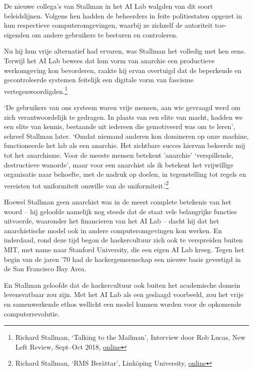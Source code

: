 \documentclass[smalldemyvopaper,11pt,twoside,onecolumn,openright,extrafontsizes,hidelinks]{memoir}
\begin{document}
De nieuwe collega's van Stallman in het AI Lab walgden van dit soort
beleidslijnen. Volgens hen hadden de beheerders in feite politiestaten
opgezet in hun respectieve computeromgevingen, waarbij ze zichzelf de
autoriteit toe-eigenden om andere gebruikers te besturen en controleren.

Nu hij hun vrije alternatief had ervaren, was Stallman het volledig met
hen eens. Terwijl het AI Lab bewees dat hun vorm van anarchie een
productieve werkomgeving kon bevorderen, raakte hij ervan overtuigd dat
de beperkende en gecontroleerde systemen feitelijk een digitale vorm van
fascisme vertegenwoordigden.\footnote{\hspace{0pt}Richard Stallman,
  `Talking to the Mailman', Interview door Rob Lucas, New Left Review,
  Sept--Oct 2018,
  \href{https://newleftreview.org/issues/ii113/articles/richard-stallman-talking-to-the-mailman}{online}}

`De gebruikers van ons systeem waren vrije mensen, aan wie gevraagd werd
om zich verantwoordelijk te gedragen. In plaats van een elite van macht,
hadden we een elite van kennis, bestaande uit iedereen die gemotiveerd
was om te leren', schreef Stallman later. `Omdat niemand anderen kon
domineren op onze machine, functioneerde het lab als een anarchie. Het
zichtbare succes hiervan bekeerde mij tot het anarchisme. Voor de meeste
mensen betekent 'anarchie' `verspillende, destructieve wanorde', maar
voor een anarchist als ik betekent het vrijwillige organisatie naar
behoefte, met de nadruk op doelen, in tegenstelling tot regels en
vereisten tot uniformiteit omwille van de uniformiteit.'\footnote{\hspace{0pt}Richard
  Stallman, `RMS Berättar', Linköping University,
  \href{http://www.lysator.liu.se/history/garb/txt/87-2-rms.txt}{online}}

Hoewel Stallman geen anarchist was in de meest complete betekenis van
het woord -- hij geloofde namelijk nog steeds dat de staat vele
belangrijke functies uitvoerde, waaronder het financieren van het AI Lab
-- dacht hij dat het anarchistische model ook in andere
computeromgevingen kon werken. En inderdaad, rond deze tijd begon de
hackercultuur zich ook te verspreiden buiten MIT, met name naar Stanford
University, die een eigen AI Lab kreeg. Tegen het begin van de jaren '70
had de hackergemeenschap een nieuwe basis gevestigd in de San Francisco
Bay Area.

En Stallman geloofde dat de hackercultuur ook buiten het academische
domein levensvatbaar zou zijn. Met het AI Lab als een geslaagd
voorbeeld, zou het vrije en samenwerkende ethos wellicht een model
kunnen worden voor de opkomende computerrevolutie.
\end{document}
